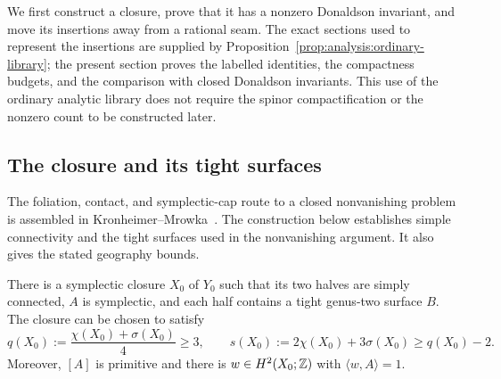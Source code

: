 We first construct a closure, prove that it has a nonzero Donaldson
invariant, and move its insertions away from a rational seam.  The exact
sections used to represent the insertions are supplied by
Proposition~\ref{prop:analysis:ordinary-library}; the present section proves
the labelled identities, the compactness budgets, and the comparison with
closed Donaldson invariants.  This use of the ordinary analytic library
does not require the spinor compactification or the nonzero count to be
constructed later.

\subsection{The closure and its tight surfaces}

The foliation, contact, and symplectic-cap route to a closed
nonvanishing problem is assembled in
Kronheimer--Mrowka~\cite[Theorem~8, Lemmas~9--14, and
Proposition~15]{KronheimerMrowka2004}.  The construction below establishes
simple connectivity and the tight surfaces used in the nonvanishing
argument.  It also gives the stated geography bounds.

\begin{lemma}\label{lem:caps:closure}
There is a symplectic closure $X_0$ of $Y_0$ such that its two halves are
simply connected, $A$ is symplectic, and each half contains a tight
genus-two surface $B$.  The closure can be chosen to satisfy
\begin{equation}\label{eq:caps:geography}
 q(X_0):=\frac{\chi(X_0)+\sigma(X_0)}4\ge3,
 \qquad s(X_0):=2\chi(X_0)+3\sigma(X_0)\ge q(X_0)-2.
\end{equation}
Moreover, $[A]$ is primitive and there is $w\in H^2(X_0;\mathbb Z)$ with
$\langle w,A\rangle=1$.
\end{lemma}

